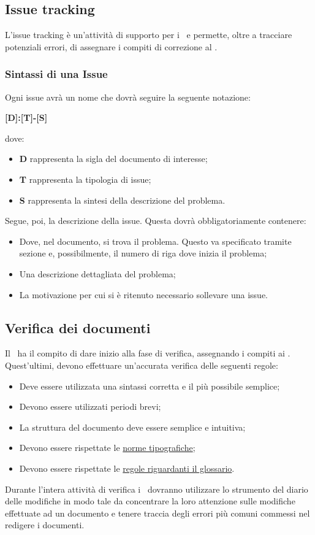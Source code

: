 \documentclass[../NormeProgetto.tex]{subfiles}
\begin{document}
		\subsection{Issue tracking}
		L'issue tracking è un'attività di supporto per i \verificatori\ e permette, oltre a tracciare potenziali errori, di assegnare i compiti di correzione al \responsabilediprogetto.
			\subsubsection{Sintassi di una Issue}
			Ogni issue avrà un nome che dovrà seguire la seguente notazione: \begin{center}\textbf{[D]:[T]-[S]}\end{center} dove:
			\begin{itemize} 
				\item \textbf{D} rappresenta la sigla del documento di interesse;
				\item \textbf{T} rappresenta la tipologia di issue;
				\item \textbf{S} rappresenta la sintesi della descrizione del problema.
			\end{itemize}
			Segue, poi, la descrizione della issue. Questa dovrà obbligatoriamente contenere:
			\begin{itemize} 
				\item Dove, nel documento, si trova il problema. Questo va specificato tramite sezione e, possibilmente, il numero di riga dove inizia il problema;
				\item Una descrizione dettagliata del problema;
				\item La motivazione per cui si è ritenuto necessario sollevare una issue.
			\end{itemize}
		\subsection{Verifica dei documenti}
		Il \responsabilediprogetto\ ha il compito di dare inizio alla fase di verifica, assegnando i compiti ai \verificatori. Quest'ultimi, devono effettuare un'accurata verifica delle seguenti regole:
		\begin{itemize}
			\item Deve essere utilizzata una sintassi corretta e il più possibile semplice;
			\item Devono essere utilizzati periodi brevi;
			\item La struttura del documento deve essere semplice e intuitiva;
			\item Devono essere rispettate le  \hyperref[sec:Norme tipografiche]{norme tipografiche};
			\item Devono essere rispettate le \hyperref[sec:Glossario]{regole riguardanti il glossario}.
		\end{itemize}
		Durante l'intera attività di verifica i \verificatori\ dovranno utilizzare lo strumento del diario delle modifiche in modo tale da concentrare la loro attenzione sulle modifiche effettuate ad un documento e tenere traccia degli errori più comuni commessi nel redigere i documenti.
\end{document}
